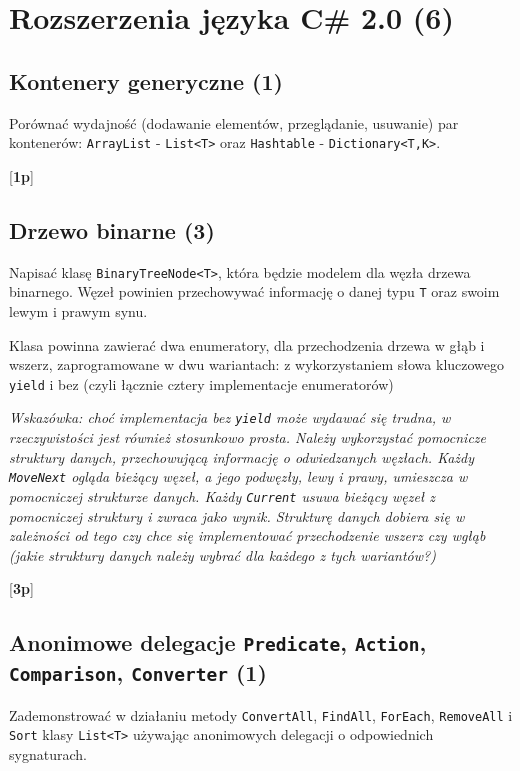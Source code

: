 ﻿\section{Rozszerzenia języka C\# 2.0 (6)}

\subsection{Kontenery generyczne (1)}

  Porównać wydajność (dodawanie elementów, przeglądanie, usuwanie) par kontenerów: {\tt ArrayList} - {\tt List<T>} 
\label{kontener_generyczny}  
  oraz {\tt Hashtable} - {\tt Dictionary<T,K>}.

  [{\bf 1p}]

\subsection{Drzewo binarne (3)}

  Napisać klasę {\tt BinaryTreeNode<T>}, która będzie modelem dla węzła
\label{drzewo_binarne}  
  drzewa binarnego. Węzeł powinien przechowywać informację o danej typu {\tt T} oraz swoim lewym i prawym synu.
   
  Klasa powinna zawierać dwa enumeratory, dla przechodzenia drzewa w głąb i wszerz, 
  zaprogramowane w dwu wariantach: z wykorzystaniem słowa kluczowego {\tt yield} i bez (czyli łącznie cztery implementacje enumeratorów)
  
  {\em Wskazówka: choć implementacja bez {\tt yield} może wydawać się trudna, w rzeczywistości jest również stosunkowo prosta. Należy 
  wykorzystać pomocnicze struktury danych, przechowującą informację o odwiedzanych węzłach. Każdy {\tt MoveNext} ogląda bieżący węzeł, a jego
  podwęzły, lewy i prawy, umieszcza w pomocniczej strukturze danych. Każdy {\tt Current} usuwa bieżący węzeł z pomocniczej struktury 
  i zwraca jako wynik. Strukturę danych dobiera się w zależności od tego czy chce się implementować przechodzenie wszerz czy wgłąb
  (jakie struktury danych należy wybrać dla każdego z tych wariantów?)}
  
  [{\bf 3p}]

\subsection{Anonimowe delegacje {\tt Predicate}, {\tt Action}, {\tt Comparison}, {\tt Converter} (1)}

  Zademonstrować w działaniu metody {\tt ConvertAll}, {\tt FindAll},  {\tt ForEach},  {\tt RemoveAll} i {\tt Sort} klasy
\label{anonimowe_delegacje}  
  {\tt List<T>} używając anonimowych delegacji o odpowiednich sygnaturach.

